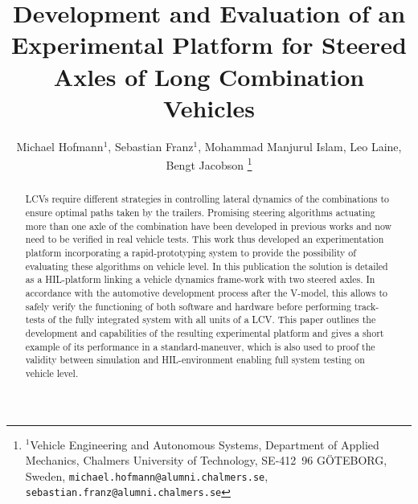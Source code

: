 \documentclass[letterpaper, 10pt, conference]{IEEEconf}      %
\title{\LARGE \bf
Development and Evaluation of an Experimental Platform for Steered Axles of Long Combination Vehicles}
\author{Michael Hofmann$^{1}$, Sebastian Franz$^{1}$, Mohammad Manjurul Islam, Leo Laine, Bengt Jacobson%
	\thanks{$^{1}$Vehicle Engineering and Autonomous Systems, Department of Applied Mechanics, Chalmers University of Technology, SE-412~96 G\"OTEBORG, Sweden,
		{\tt\small michael.hofmann@alumni.chalmers.se},
		{\tt\small sebastian.franz@alumni.chalmers.se}}%
}
\begin{document}
\maketitle
\thispagestyle{empty}
\pagestyle{empty}


\begin{abstract}

	\glspl{LCV} require different strategies in controlling lateral dynamics of the combinations to ensure optimal paths taken by the trailers. Promising steering algorithms actuating more than one axle of the combination have been developed in previous works and now need to be verified in real vehicle tests. This work thus developed an experimentation platform incorporating a rapid-prototyping system to provide the possibility of evaluating these algorithms on vehicle level. In this publication the solution is detailed as a \gls{HIL}-platform linking a vehicle dynamics frame-work with two steered axles. In accordance with the automotive development process after the V-model, this allows to safely verify the functioning of both software and hardware before performing track-tests of the fully integrated system with all units of a \gls{LCV}. This paper outlines the development and capabilities of the resulting experimental platform and gives a short example of its performance in a standard-maneuver, which is also used to proof the validity between simulation and \gls{HIL}-environment enabling full system testing on vehicle level.

\end{abstract}








%



%





\addtolength{\textheight}{-12cm}   %



\printbibliography
\end{document}
